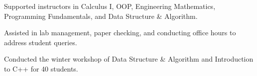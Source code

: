 \documentclass[]{resume}
\begin{document}
\begin{minipage}[t]{0.5\textwidth}

    \begin{tightemize}
        \sectionsep
        \item Supported instructors in Calculus I, OOP, Engineering Mathematics, Programming Fundamentals, and Data Structure \& Algorithm.
        \item Assisted in lab management, paper checking, and conducting office hours to address student queries.
    \end{tightemize}


    \begin{tightemize}
        \sectionsep
        \item Conducted the winter workshop of Data Structure \& Algorithm and Introduction to C++ for 40 students.
    \end{tightemize}





\end{minipage}
\end{document}
